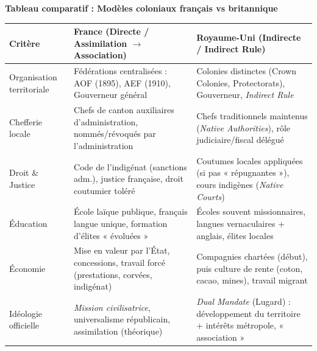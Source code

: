\documentclass[11pt]{article}
\newcounter{popsec}
\newcounter{popsub}
\newcommand{\courssub}[1]{%
  \stepcounter{popsub}%
  \par\vspace{9pt}\noindent{\popxbold\fontsize{11.5}{13}\selectfont\color{popink}{\color{poporange}\thepopsec.\thepopsub}\hspace{6pt}#1}\par\nopagebreak\vspace{4pt}
}
\begin{document}
\begin{aretenir}
\textbf{Tableau comparatif : Modèles coloniaux français vs britannique}
\begin{center}
\begin{tabularx}{\linewidth}{|l|X|X|}\hline
\rowcolor{popblueL}
\textbf{Critère} & \textbf{France (Directe / Assimilation $\rightarrow$ Association)} & \textbf{Royaume-Uni (Indirecte / Indirect Rule)} \\\hline
Organisation territoriale & Fédérations centralisées : AOF (1895), AEF (1910), Gouverneur général & Colonies distinctes (Crown Colonies, Protectorats), Gouverneur, \emph{Indirect Rule} \\\hline
Chefferie locale & Chefs de canton auxiliaires d'administration, nommés/révoqués par l'administration & Chefs traditionnels maintenus (\emph{Native Authorities}), rôle judiciaire/fiscal délégué \\\hline
Droit \& Justice & Code de l'indigénat (sanctions adm.), justice française, droit coutumier toléré & Coutumes locales appliquées (si pas « répugnantes »), cours indigènes (\emph{Native Courts}) \\\hline
Éducation & École laïque publique, français langue unique, formation d'élites « évoluées » & Écoles souvent missionnaires, langues vernaculaires + anglais, élites locales \\\hline
Économie & Mise en valeur par l'État, concessions, travail forcé (prestations, corvées, indigénat) & Compagnies chartées (début), puis culture de rente (coton, cacao, mines), travail migrant \\\hline
Idéologie officielle & \emph{Mission civilisatrice}, universalisme républicain, assimilation (théorique) & \emph{Dual Mandate} (Lugard) : développement du territoire + intérêts métropole, « association » \\\hline
\end{tabularx}
\end{center}

\end{aretenir}

\courssub{Checklist avant le Bac}
\end{document}
